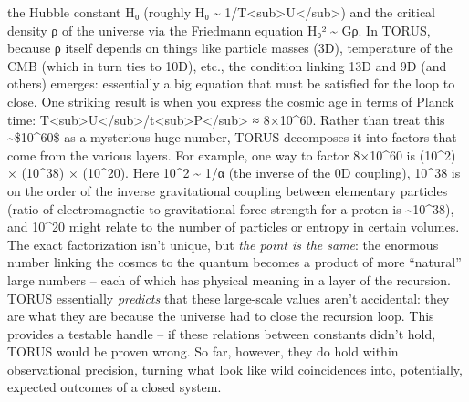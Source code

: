 \documentclass[
]{article}
\begin{document}
\begin{itemize}
  the Hubble constant H₀ (roughly H₀ \textasciitilde{}
  1/T\textless sub\textgreater U\textless/sub\textgreater) and the
  critical density ρ of the universe via the Friedmann equation H₀²
  \textasciitilde{} Gρ\hspace{0pt}. In TORUS, because ρ itself depends
  on things like particle masses (3D), temperature of the CMB (which in
  turn ties to 10D), etc., the condition linking 13D and 9D (and others)
  emerges: essentially a big equation that must be satisfied for the
  loop to close. One striking result is when you express the cosmic age
  in terms of Planck time:
  T\textless sub\textgreater U\textless/sub\textgreater/t\textless sub\textgreater P\textless/sub\textgreater{}
  ≈ 8×10\^{}60\hspace{0pt}. Rather than treat this
  \textasciitilde\$10\^{}60\$ as a mysterious huge number, TORUS
  decomposes it into factors that come from the various
  layers\hspace{0pt}. For example, one way to factor 8×10\^{}60 is
  (10\^{}2) × (10\^{}38) × (10\^{}20)\hspace{0pt}. Here 10\^{}2
  \textasciitilde{} 1/α (the inverse of the 0D coupling), 10\^{}38 is on
  the order of the inverse gravitational coupling between elementary
  particles (ratio of electromagnetic to gravitational force strength
  for a proton is \textasciitilde10\^{}38), and 10\^{}20 might relate to
  the number of particles or entropy in certain volumes\hspace{0pt}. The
  exact factorization isn't unique, but \emph{the point is the same}:
  the enormous number linking the cosmos to the quantum becomes a
  product of more ``natural'' large numbers -- each of which has
  physical meaning in a layer of the recursion\hspace{0pt}. TORUS
  essentially \emph{predicts} that these large-scale values aren't
  accidental: they are what they are because the universe had to close
  the recursion loop. This provides a testable handle -- if these
  relations between constants didn't hold, TORUS would be proven
  wrong\hspace{0pt}. So far, however, they do hold within observational
  precision, turning what look like wild coincidences into, potentially,
  expected outcomes of a closed system.
\end{itemize}
\end{document}

